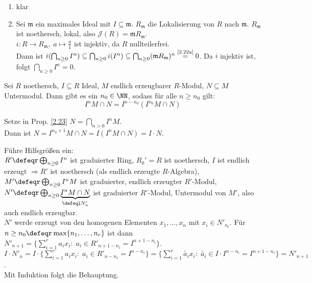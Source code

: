 \begin{Bew}
  \begin{enumerate}
    \item klar
    \item Sei $\mathfrak{m}$ ein maximales Ideal mit $I \subseteq \mathfrak{m}$.
    $R_{\mathfrak{m}}$ die Lokalisierung von $R$ nach $\mathfrak{m}$.
    $R_{\mathfrak{m}}$ ist noethersch, lokal, also $\mathcal{J}(R) = \mathfrak{m} R_{\mathfrak{m}}$.\\
    $i: R \to R_{\mathfrak{m}}, \; a \mapsto \frac{a}{1}$ ist injektiv, da $R$ nullteilerfrei.\\
    Dann ist $i(\bigcap_{n \geq 0} I^n) \subseteq \bigcap_{n \geq 0} i(I^n)
    \subseteq \bigcap_{n \geq 0}(\mathfrak{m} R_{\mathfrak{m}})^n
    \overset{\text{\scriptsize\ref{2.22a}}}{=} 0$. Da $i$ injektiv ist, folgt
    $\bigcap_{n \geq 0} I^n = 0$.
  \end{enumerate}
\end{Bew}

\begin{Prop}
\label{2.23}
  Sei $R$ noethersch, $I \subseteq R$ Ideal, $M$ endlich erzeugbarer $R$-Modul, $N \subseteq M$ Untermodul.
  Dann gibt es ein $n_0 \in \NN$, sodass für alle $n \geq n_0$ gilt:
  \[I^n M \cap N = I ^{n-n_0} (I^{n_0}M \cap N)\]
\end{Prop}

\begin{Bew}
  Setze in Prop. \ref{2.23} $N = \bigcap_{n > 0} I^n M$.\\
  Dann ist $N = I^{n_0 +1} M \cap N = I (I^n M \cap N) = I \cdot N$.
\end{Bew}

\begin{Bew}
  Führe Hilfsgrößen ein:\\
  $R' \defeqr \bigoplus_{n \geq 0} I^n$ ist graduierter Ring, $R_0' = R$ ist noethersch, $I$ ist endlich erzeugt $\Rightarrow R'$ ist noethersch (als endlich erzeugte $R$-Algebra), $M' \defeqr \bigoplus_{n \geq 0} I^n M$ ist graduierter, endlich erzeugter $R'$-Modul, $N' \defeqr \bigoplus_{n \geq 0} \underset{\defeql N'_n}{\underbrace{I^nM \cap N}}$ ist graduierter $R'$-Modul, Untermodul von $M'$, also auch endlich erzeugbar.\\
  $N'$ werde erzeugt von den homogenen Elementen $x_1, \dots, x_n$ mit $x_i \in N'_{n_i}$.
  Für $n \geq n_0 \defeqr \max \{n_1, \dots, n_r\}$ ist dann $N'_{n+1} = \{\sum_{i=1}^r a_i x_i: \; a_i \in R'_{n+1-n_i} = I^{n+1-n_i}\}$. $I \cdot N'_n = I \cdot \{\sum_{i=1}^r a_i x_i: \; a_i \in R'_{n-n_i} = I^{n-n_i}\} = \{\sum_{i=1}^r \tilde{a_i} x_i: \; \tilde{a_i} \in I \cdot I^{n-n_i} = I^{n+1-n_i}\} = N'_{n+1}$.\\
  Mit Induktion folgt die Behauptung.
\end{Bew}

